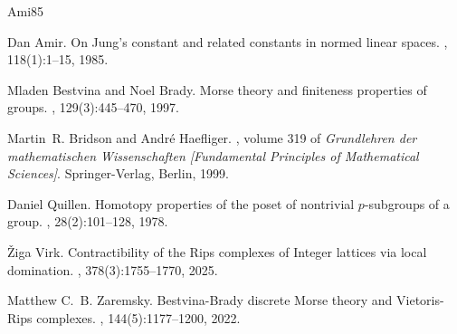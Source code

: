 \documentclass[a4paper,11pt]{amsart}
\theoremstyle{definition}
\numberwithin{equation}{section}
\begin{document}

\begin{thebibliography}{Ami85}

Dan Amir.
\newblock On {J}ung's constant and related constants in normed linear spaces.
, 118(1):1--15, 1985.

Mladen Bestvina and Noel Brady.
\newblock Morse theory and finiteness properties of groups.
, 129(3):445--470, 1997.

Martin~R. Bridson and Andr\'{e} Haefliger.
, volume 319 of {\em Grundlehren der mathematischen Wissenschaften [Fundamental Principles of Mathematical Sciences]}.
\newblock Springer-Verlag, Berlin, 1999.

Daniel Quillen.
\newblock Homotopy properties of the poset of nontrivial {$p$}-subgroups of a group.
, 28(2):101--128, 1978.

{\v Z}iga Virk.
\newblock Contractibility of the {R}ips complexes of {I}nteger lattices via local domination.
, 378(3):1755--1770, 2025.

Matthew C.~B. Zaremsky.
\newblock Bestvina-{B}rady discrete {M}orse theory and {V}ietoris-{R}ips complexes.
, 144(5):1177--1200, 2022.

\end{thebibliography}
\end{document}
